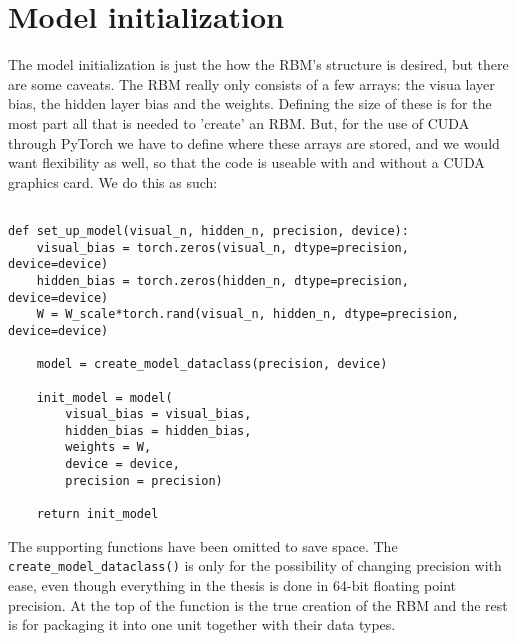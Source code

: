 \section{Model initialization}

The model initialization is just the how the RBM's structure is desired, but there are some caveats. The RBM really only consists of a few arrays: the visua layer bias, the hidden layer bias and the weights. Defining the size of these is for the most part all that is needed to 'create' an RBM. But, for the use of CUDA through PyTorch we have to define where these arrays are stored, and we would want flexibility as well, so that the code is useable with and without a CUDA graphics card. We do this as such:

\begin{verbatim}

def set_up_model(visual_n, hidden_n, precision, device):
    visual_bias = torch.zeros(visual_n, dtype=precision, device=device)
    hidden_bias = torch.zeros(hidden_n, dtype=precision, device=device)
    W = W_scale*torch.rand(visual_n, hidden_n, dtype=precision, device=device)
    
    model = create_model_dataclass(precision, device)

    init_model = model(
        visual_bias = visual_bias,
        hidden_bias = hidden_bias,
        weights = W,
        device = device, 
        precision = precision)
    
    return init_model
\end{verbatim}

The supporting functions have been omitted to save space. The \texttt{create_model_dataclass()} is only for the possibility of changing precision with ease, even though everything in the thesis is done in 64-bit floating point precision. At the top of the function is the true creation of the RBM and the rest is for packaging it into one unit together with their data types. 
